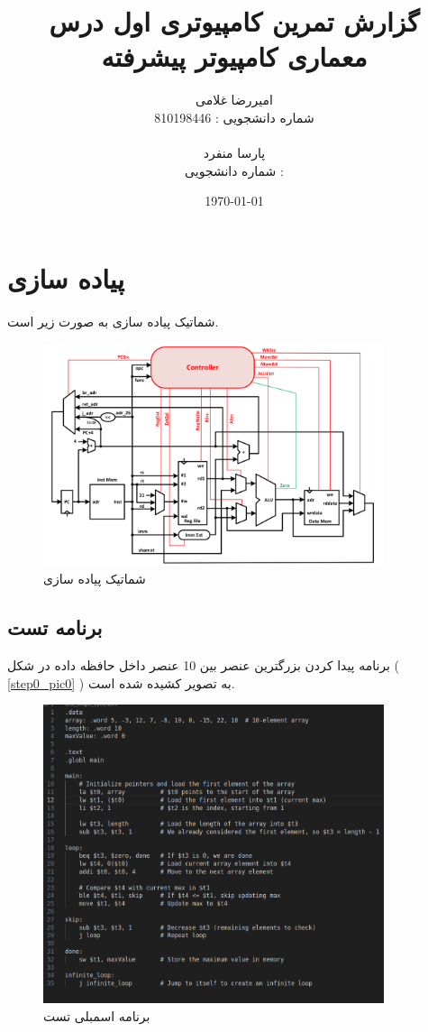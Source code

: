 \documentclass[11pt, a4paper]{article}
\title{گزارش تمرین کامپیوتری اول درس معماری کامپیوتر پیشرفته}
\author{ امیررضا غلامی\mm \\
	شماره دانشجویی : 810198446 \\
	\\
	پارسا منفرد \\
	شماره دانشجویی :
}
\date{\today}
\begin{document}
	\maketitle
	\vspace{15cm}
	\tableofcontents
	
	\pagebreak


	\section{پیاده سازی 
		}
		شماتیک پیاده سازی 
		به صورت زیر است.
		\begin{figure}[H]
			\begin{center}
				\includegraphics[width=10cm]{Photos/single_cycle.png}
			\end{center}
			\caption{شماتیک پیاده سازی 
			}
			\label{single_cycle}
		\end{figure}
	

		
	\subsection{برنامه تست}
	برنامه پیدا کردن بزرگترین عنصر بین 10 عنصر داخل حافظه داده در شکل (
	\ref{step0_pic0}
	)
	به تصویر کشیده شده است. 
	\begin{figure}[H]
		\begin{center}
			\includegraphics[width=10cm]{Photos/1.png}
		\end{center}
		\caption{برنامه اسمبلی تست}
		\label{test_asm}
	\end{figure}
	
\end{document}
